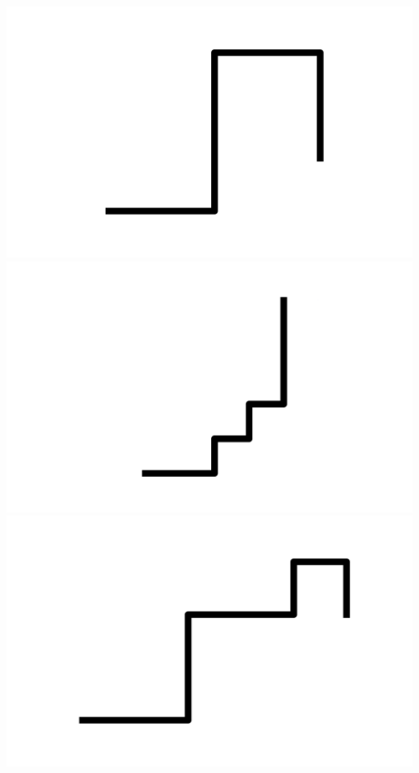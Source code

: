 \documentclass[]{report}
\begin{document}
\includegraphics[scale=.1]{pictures/21/state_cluster_shapes_400.pdf} 
\includegraphics[scale=.1]{pictures/21/state_cluster_shapes_401.pdf} 
\includegraphics[scale=.1]{pictures/21/state_cluster_shapes_402.pdf} 
\end{document}
